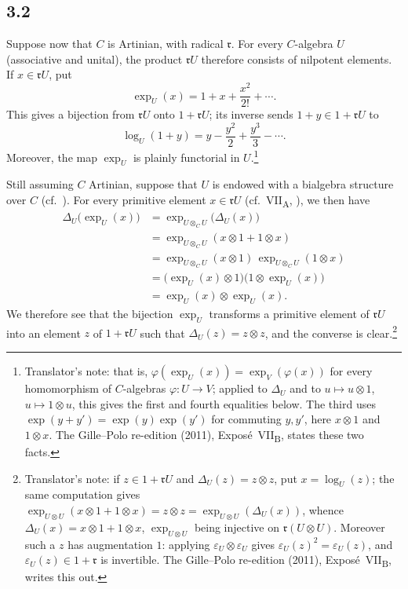 
\subsection*{3.2}
\label{sga3:VIIB:3.2}

Suppose now that \(C\) is Artinian, with radical \(\mathfrak r\).
For every \(C\)-algebra \(U\) \textup{(associative and unital)}, the
product \(\mathfrak rU\) therefore consists of nilpotent elements. If
\(x\in\mathfrak rU\), put
\[
  \exp_U(x)
  =
  1+x+\frac{x^2}{2!}+\cdots.
\]
This gives a bijection from \(\mathfrak rU\) onto
\(1+\mathfrak rU\); its inverse sends \(1+y\in1+\mathfrak rU\) to
\[
  \log_U(1+y)
  =
  y-\frac{y^2}{2}+\frac{y^3}{3}-\cdots.
\]
Moreover, the map \(\exp_U\) is plainly functorial in
\(U\).\footnote{Translator's note: that is, \(\varphi(\exp_U(x))=\exp_V(\varphi(x))\) for every homomorphism
of \(C\)-algebras \(\varphi\colon U\to V\); applied to \(\Delta_U\) and to \(u\mapsto u\otimes1\),
\(u\mapsto1\otimes u\), this gives the first and fourth equalities below. The third uses
\(\exp(y+y')=\exp(y)\exp(y')\) for commuting \(y,y'\), here \(x\otimes1\) and \(1\otimes x\). The
Gille--Polo re-edition (2011), Expos\'e~VII\textsubscript{B}, states these two facts.}

Still assuming \(C\) Artinian, suppose that \(U\) is endowed with a
bialgebra structure over \(C\) \textup{(cf.\ )}. For every
primitive element \(x\in\mathfrak rU\)
\textup{(cf.\ VII\textsubscript{A}, )}, we then have
\[
\begin{aligned}
  \Delta_U\bigl(\exp_U(x)\bigr)
  &=
  \exp_{U\otimes_CU}\bigl(\Delta_U(x)\bigr)
  \\
  &=
  \exp_{U\otimes_CU}(x\otimes1+1\otimes x)
  \\
  &=
  \exp_{U\otimes_CU}(x\otimes1)\,
  \exp_{U\otimes_CU}(1\otimes x)
  \\
  &=
  \bigl(\exp_U(x)\otimes1\bigr)
  \bigl(1\otimes\exp_U(x)\bigr)
  \\
  &=
  \exp_U(x)\otimes\exp_U(x).
\end{aligned}
\]
We therefore see that the bijection \(\exp_U\) transforms a primitive
element of \(\mathfrak rU\) into an element \(z\) of \(1+\mathfrak rU\) such
that \(\Delta_U(z)=z\otimes z\), and the converse is clear.\footnote{Translator's note: if
\(z\in1+\mathfrak rU\) and \(\Delta_U(z)=z\otimes z\), put \(x=\log_U(z)\); the same computation gives
\(\exp_{U\otimes U}(x\otimes1+1\otimes x)=z\otimes z=\exp_{U\otimes U}(\Delta_U(x))\), whence
\(\Delta_U(x)=x\otimes1+1\otimes x\), \(\exp_{U\otimes U}\) being injective on \(\mathfrak r(U\otimes U)\).
Moreover such a \(z\) has augmentation \(1\): applying \(\varepsilon_U\otimes\varepsilon_U\) gives
\(\varepsilon_U(z)^2=\varepsilon_U(z)\), and \(\varepsilon_U(z)\in1+\mathfrak r\) is invertible. The
Gille--Polo re-edition (2011), Expos\'e~VII\textsubscript{B}, writes this out.}

